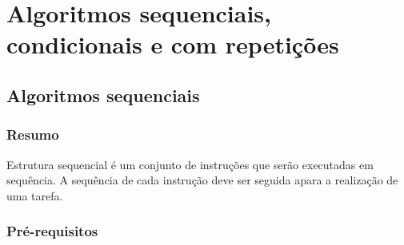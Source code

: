 
\part[Algoritmos sequenciais, condicionais e com repetições]
{Algoritmos sequenciais, condicionais e com repetições}


\chapter[Algoritmos sequenciais]
{Algoritmos sequenciais}


\section*{Resumo}

Estrutura sequencial é um conjunto de instruções que serão executadas em sequência. A sequência de cada instrução deve ser seguida apara a realização de uma tarefa.

\section*{Pré-requisitos}

